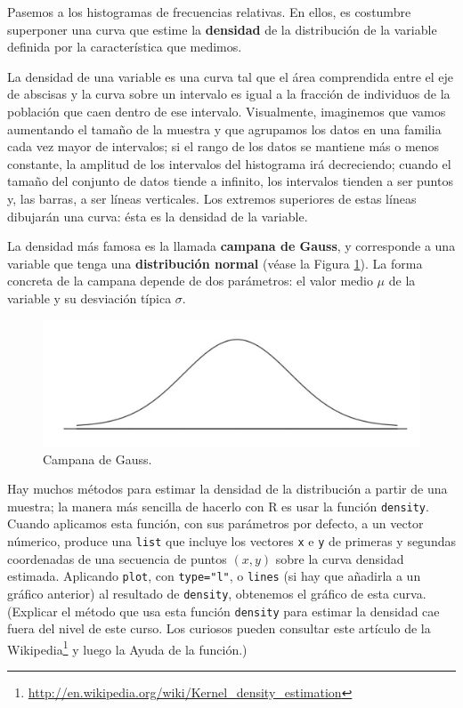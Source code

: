 \documentclass[
]{book}
\DeclareRobustCommand{\href}[2]{#2\footnote{\url{#1}}}
\theoremstyle{definition}
\theoremstyle{definition}
\theoremstyle{definition}
\theoremstyle{remark}
\begin{document}
Pasemos a los histogramas de frecuencias relativas. En ellos, es costumbre superponer una curva que estime la \textbf{densidad} de la
distribución de la variable definida por la característica que medimos.

La densidad de una variable es una curva tal que el área comprendida entre el eje de abscisas y la curva sobre un intervalo es igual a la fracción de individuos de la población que caen dentro de ese intervalo. Visualmente,
imaginemos que vamos aumentando el tamaño de la muestra y que agrupamos los datos
en una familia cada vez mayor de intervalos; si el rango de los datos se mantiene más o menos constante, la amplitud de los
intervalos del histograma irá decreciendo; cuando el tamaño del conjunto de datos tiende a infinito,
los intervalos tienden a ser puntos y, las barras, a ser líneas verticales. Los extremos superiores de estas líneas dibujarán una curva: ésta es la densidad de la variable.

La densidad más famosa es la llamada \textbf{campana de Gauss}, y corresponde a una variable que tenga una \textbf{distribución normal} (véase la Figura \ref{fig:norm}). La forma concreta de la campana depende de dos parámetros: el valor medio \(\mu\) de la variable y su desviación típica \(\sigma\).

\begin{figure}

{\centering \includegraphics[width=1\linewidth]{AprendeR-Parte-I_files/figure-html/gauss} 

}

\caption{Campana de Gauss.}\label{fig:norm}
\end{figure}

Hay muchos métodos para estimar la densidad de la distribución a partir de una muestra; la manera más sencilla de hacerlo con R es usar la función \texttt{density}. Cuando aplicamos esta función, con sus parámetros por defecto, a un vector númerico, produce una \texttt{list} que incluye los vectores \texttt{x} e \texttt{y} de primeras y segundas coordenadas de una secuencia de puntos \((x,y)\) sobre la curva densidad estimada. Aplicando \texttt{plot}, con \texttt{type="l"}, o \texttt{lines} (si hay que añadirla a un gráfico anterior) al resultado de \texttt{density}, obtenemos el gráfico de esta curva. (Explicar el método que usa esta función \texttt{density} para estimar la densidad cae fuera del nivel de este curso. Los curiosos pueden consultar \href{http://en.wikipedia.org/wiki/Kernel_density_estimation}{este artículo de la Wikipedia} y luego la Ayuda de la función.)
\end{document}
